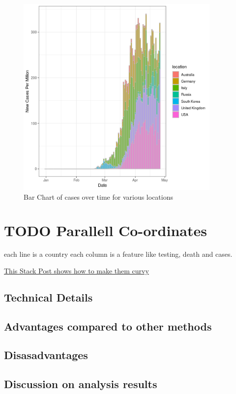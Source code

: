 \documentclass[11pt]{article}
\begin{document}
\begin{figure}[htbp]
\centering
\includegraphics[width=10cm]{barex.png}
\caption{\label{fig:org523e75a}Bar Chart of cases over time for various locations}
\end{figure}



\section{{\bfseries\sffamily TODO} Parallell Co-ordinates}
\label{sec:orgaf89db0}
each line is a country
each column is a feature like testing, death and cases.

\href{https://stackoverflow.com/a/35206832/10593632}{This Stack Post shows how to make them curvy}

\subsection{Technical Details}
\label{sec:org4c354d5}
\subsection{Advantages compared to other methods}
\label{sec:orgc174a83}
\subsection{Disasadvantages}
\label{sec:orgb378527}
\subsection{Discussion on analysis results}
\label{sec:org9116196}
\end{document}
